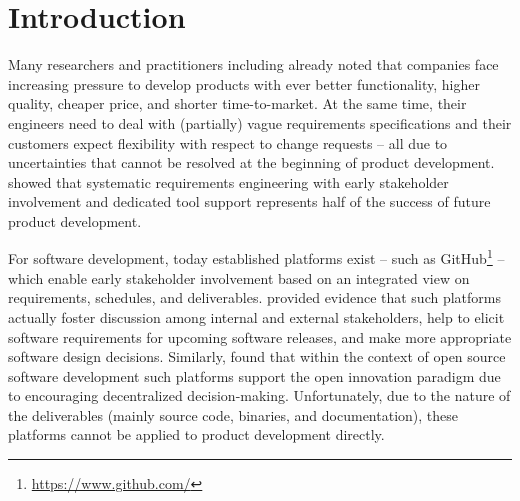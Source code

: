 \section{Introduction}
\label{sec:introduction}

Many researchers and practitioners including \cite{Ahti2005} already noted that companies face increasing pressure to develop products with ever better functionality, higher quality, cheaper price, and shorter time-to-market.
At the same time, their engineers need to deal with (partially) vague requirements specifications and their customers expect flexibility with respect to change requests -- all due to uncertainties that cannot be resolved at the beginning of product development.
\cite{Anitha2012} showed that systematic requirements engineering with early stakeholder involvement and dedicated tool support represents half of the success of future product development.

For software development, today established platforms exist -- such as GitHub\footnote{\url{https://www.github.com/}} -- which enable early stakeholder involvement based on an integrated view on requirements, schedules, and deliverables.
\cite{Tsay2014} provided evidence that such platforms actually foster discussion among internal and external stakeholders, help to elicit software requirements for upcoming software releases, and make more appropriate software design decisions.
Similarly, \cite{Lee2016} found that within the context of open source software development such platforms support the open innovation paradigm due to encouraging decentralized decision-making.
Unfortunately, due to the nature of the deliverables (mainly source code, binaries, and documentation), these platforms cannot be applied to product development directly.

